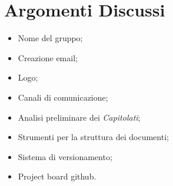 \section{Argomenti Discussi}
	\begin{itemize}
		\item Nome del gruppo;
		\item Creazione email;
		\item Logo;
		\item Canali di comunicazione;
		\item Analisi preliminare dei \textit{Capitolati\glos};
		\item Strumenti per la struttura dei documenti;
		\item Sistema di versionamento\glo;
		\item Project board github.
	\end{itemize}